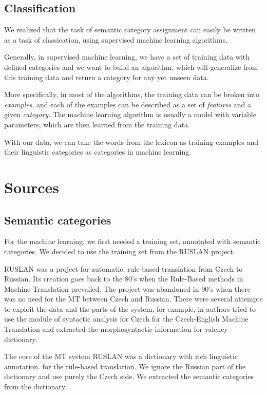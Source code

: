 \documentclass[letterpaper]{article}
\begin{document}
\subsection{Classification}
We realized that the task of semantic category assignment can easily be written as a task of classication, using supervised machine learning algorithms.

Generally, in supervised machine learning, we have a set of training data with defined categories and we want to build an algorithm, which will generalize from this training data and return a category for any yet unseen data.

More specifically, in most of the algorithms, the training data can be broken into \textit{examples}, and each of the examples can be described as a set of \textit{features} and a given \textit{category}. The machine learning algorithm is usually a model with variable parameters, which are then learned from the training data.


With our data, we can take the words from the lexicon as training examples and their linguistic categories as categories in machine learning.



\section{Sources}
\subsection{Semantic categories}
For the machine learning, we first needed a training set, annotated with semantic categories. 
We decided to use the training set from the RUSLAN project.


RUSLAN was a project for automatic, rule-based translation from Czech to Russian. 
Its creation \cite{oliva1989parser} goes back to the 80's when the Rule-Based 
methods in Machine Translation prevailed.  The project was abandoned in 90's when
there was no need for the MT between Czech and Russian. There were
several attempts to exploit the data and the parts of the system, for
example, in \cite{mt-recycled} authors tried to use the module
of syntactic analysis for Czech for the Czech-English Machine Translation
and \cite{pisa2010} extracted the morphosyntactic information for
valency dictionary.

The core of the MT system RUSLAN was a dictionary with rich linguistic annotation.
for the rule-based translation. We ignore the Russian 
part of the dictionary and use purely the Czech side. We extracted the 
semantic categories from the dictionary. 
\end{document}
